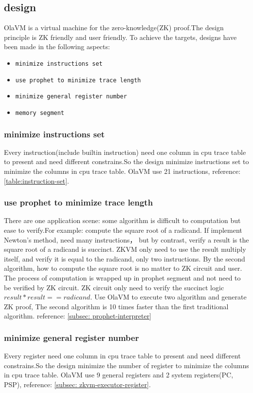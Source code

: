 \subsection{design}\label{subsec: vm-design}
OlaVM is a virtual machine for the zero-knowledge(ZK) proof.The design principle is ZK friendly and user friendly.
To achieve the targets, designs have been made in the following aspects:

\begin{itemize}
    \item \verb|minimize instructions set|
    \item \verb|use prophet to minimize trace length|
    \item \verb|minimize general register number|
    \item \verb|memory segment|
\end{itemize}

\subsubsection{minimize instructions set}
Every instruction(include builtin instruction) need one column in cpu trace table to present and need different constrains.So the design minimize instructions set to minimize the columns in cpu trace table.
OlaVM use 21 instructions, reference: \ref{table:instruction-set}.

\subsubsection{use prophet to minimize trace length}
There are one application scene: some algorithm is difficult to computation but ease to verify.For example: compute the square root of a radicand.
If implement Newton's method, need many instructions， but by contrast, verify a result is the square root of a radicand is succinct.
ZKVM only need to use the result multiply itself, and verify it is equal to the radicand, only two instructions.
By the second algorithm, how to compute the square root is no matter to ZK circuit and user.
The process of computation is wrapped up in prophet segment and not need to be verified by ZK circuit.
ZK circuit only need to verify the succinct logic $result*result == radicand$.
Use OlaVM to execute two algorithm and generate ZK proof, The second algorithm is 10 times faster than the first traditional algorithm.
reference: \ref{subsec: prophet-interpreter}

\subsubsection{minimize general register number}
Every register need one column in cpu trace table to present and need different constrains.So the design minimize the number of register to minimize the columns in cpu trace table.
OlaVM use 9 general registers and 2 system registers(PC, PSP),  reference: \ref{subsec: zkvm-executor-register}.

